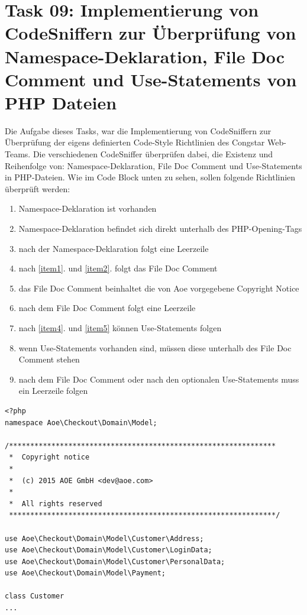 \documentclass[11pt,a4paper]{article}
\begin{document}
\section{Task 09: Implementierung von CodeSniffern zur Überprüfung von Namespace-Deklaration, File Doc Comment und Use-Statements von PHP Dateien}

Die Aufgabe dieses Tasks, war die Implementierung von CodeSniffern zur Überprüfung
der eigens definierten Code-Style Richtlinien des Congstar Web-Teams. Die verschiedenen CodeSniffer 
überprüfen dabei, die Existenz und Reihenfolge von: Namespace-Deklaration, 
File Doc Comment und Use-Statements in PHP-Dateien. Wie im Code Block unten zu sehen, sollen 
folgende Richtlinien überprüft werden:

\begin{enumerate}
  \item Namespace-Deklaration ist vorhanden
  \item Namespace-Deklaration befindet sich direkt unterhalb des PHP-Opening-Tags \label{item1}
  \item nach der Namespace-Deklaration folgt eine Leerzeile \label{item2}
  \item nach \ref{item1}. und \ref{item2}. folgt das File Doc Comment
  \item das File Doc Comment beinhaltet die von Aoe vorgegebene Copyright Notice \label{item4}
  \item nach dem File Doc Comment folgt eine Leerzeile \label{item5}
  \item nach \ref{item4}. und \ref{item5} können Use-Statements folgen
  \item wenn Use-Statements vorhanden sind, müssen diese unterhalb des File Doc Comment stehen
  \item nach dem File Doc Comment oder nach den optionalen Use-Statements muss ein Leerzeile folgen
\end{enumerate}

\begin{lstlisting} 
<?php
namespace Aoe\Checkout\Domain\Model;
 
/***************************************************************
 *  Copyright notice
 *
 *  (c) 2015 AOE GmbH <dev@aoe.com>
 *
 *  All rights reserved
 ***************************************************************/
 
use Aoe\Checkout\Domain\Model\Customer\Address;
use Aoe\Checkout\Domain\Model\Customer\LoginData;
use Aoe\Checkout\Domain\Model\Customer\PersonalData;
use Aoe\Checkout\Domain\Model\Payment;
 
class Customer
...
\end{lstlisting} \label{codesniffer}
\end{document}
